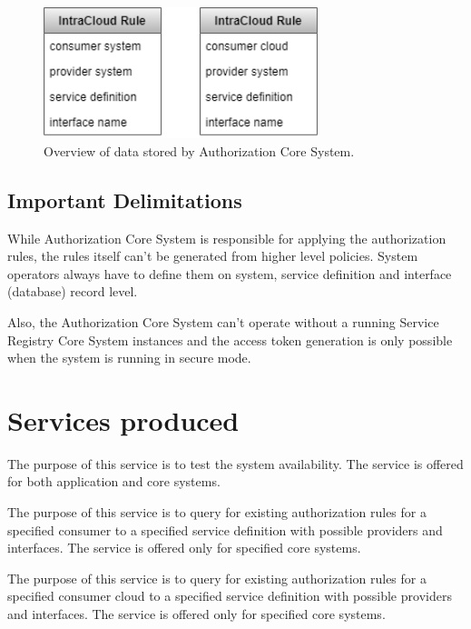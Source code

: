 \documentclass[a4paper]{arrowhead}
\begin{document}
\begin{figure}[h!]
  \centering
  \includegraphics[width=8cm]{figures/authorization_data_overview.png}
  \caption{
    Overview of data stored by Authorization Core System.
  }
  \label{fig:information_overview}
\end{figure}

\subsection{Important Delimitations}
\label{sec:delimitations}

While Authorization Core System is responsible for applying the authorization rules, the rules itself can't be generated from higher level policies. System operators always have to define them on system, service definition and interface (database) record level. 

Also, the Authorization Core System can't operate without a running Service Registry Core System instances and the access token generation is only possible when the system is running in secure mode.

\newpage

\section{Services produced}
\label{sec:services}

The purpose of this service is to test the system availability. The service is offered for both application and core systems. 

The purpose of this service is to query for existing authorization rules for a specified consumer to a specified service definition with possible providers and interfaces. The service is offered only for specified core systems.

The purpose of this service is to query for existing authorization rules for a specified consumer cloud to a specified service definition with possible providers and interfaces. The service is offered only for specified core systems.
\end{document}
